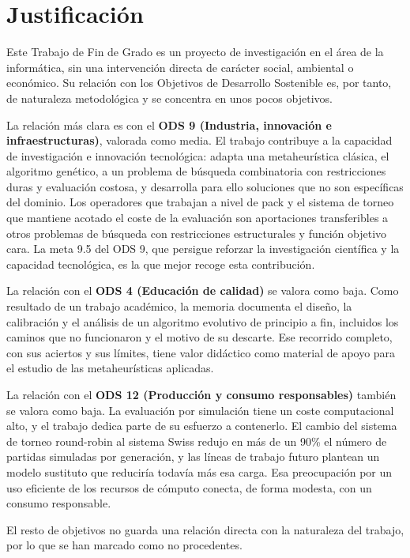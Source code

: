 
\section*{Justificación}

Este Trabajo de Fin de Grado es un proyecto de investigación en el área de la informática, sin una intervención directa de carácter social, ambiental o económico. Su relación con los Objetivos de Desarrollo Sostenible es, por tanto, de naturaleza metodológica y se concentra en unos pocos objetivos.

La relación más clara es con el \textbf{ODS 9 (Industria, innovación e infraestructuras)}, valorada como media. El trabajo contribuye a la capacidad de investigación e innovación tecnológica: adapta una metaheurística clásica, el algoritmo genético, a un problema de búsqueda combinatoria con restricciones duras y evaluación costosa, y desarrolla para ello soluciones que no son específicas del dominio. Los operadores que trabajan a nivel de pack y el sistema de torneo que mantiene acotado el coste de la evaluación son aportaciones transferibles a otros problemas de búsqueda con restricciones estructurales y función objetivo cara. La meta 9.5 del ODS 9, que persigue reforzar la investigación científica y la capacidad tecnológica, es la que mejor recoge esta contribución.

La relación con el \textbf{ODS 4 (Educación de calidad)} se valora como baja. Como resultado de un trabajo académico, la memoria documenta el diseño, la calibración y el análisis de un algoritmo evolutivo de principio a fin, incluidos los caminos que no funcionaron y el motivo de su descarte. Ese recorrido completo, con sus aciertos y sus límites, tiene valor didáctico como material de apoyo para el estudio de las metaheurísticas aplicadas.

La relación con el \textbf{ODS 12 (Producción y consumo responsables)} también se valora como baja. La evaluación por simulación tiene un coste computacional alto, y el trabajo dedica parte de su esfuerzo a contenerlo. El cambio del sistema de torneo round-robin al sistema Swiss redujo en más de un 90\% el número de partidas simuladas por generación, y las líneas de trabajo futuro plantean un modelo sustituto que reduciría todavía más esa carga. Esa preocupación por un uso eficiente de los recursos de cómputo conecta, de forma modesta, con un consumo responsable.

El resto de objetivos no guarda una relación directa con la naturaleza del trabajo, por lo que se han marcado como no procedentes.
